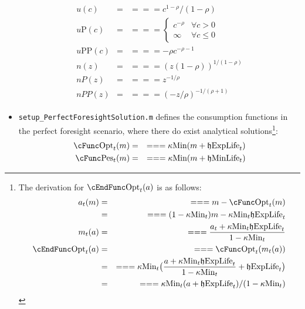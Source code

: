 \documentclass[titlepage,abstract]{\econtex}
\providecommand{\kappaMin}{\kappa\text{Min}}
\providecommand{\cFuncOpt}{\cFunc\text{Opt}}
\providecommand{\cFuncPes}{\cFunc\text{Pes}}
\providecommand{\cEndFuncOpt}{\cEndFunc\text{Opt}}
\providecommand{\hEndExpLife}{\mathfrak{h}\text{ExpLife}}
\providecommand{\hEndMinLife}{\mathfrak{h}\text{MinLife}}
\providecommand{\uP}{u\text{P}}
\providecommand{\uPP}{u\text{PP}}
\begin{document}
\begin{itemize}
\begin{equation}
\begin{gathered}
\begin{aligned}
      u(c)    &=& =  =  =  c^{1-\rho}/(1-\rho) \\
      \uP(c)    &=& =  =  = 
      \begin{cases}
      c^{-\rho} & \forall c>0 \\
      \infty & \forall c \leq 0
      \end{cases} \\
      \uPP(c)    &=& =  =  =  -\rho c^{-\rho-1} \\
      n(z)    &=& =  =  =  (z(1-\rho))^{1/(1-\rho)} \\
      nP(z)    &=& =  =  =  z^{-1/\rho} \\
      nPP(z)    &=& =  =  =  (-z/\rho)^{-1/(\rho+1)}
      \end{aligned}\end{gathered}\end{equation}
      \item \texttt{setup\_PerfectForesightSolution.m} defines the consumption functions in the perfect foresight scenario, where there do exist analytical solutions\footnote{
          The derivation for $\cEndFuncOpt_{t}(a)$ is as follows:
          \begin{equation}\begin{gathered}\begin{aligned}
          a_{t}(m)    &=& =  =  =  m-\cFuncOpt_{t}(m) \\
             &=& =  =  =  (1-\kappaMin_{t}) m -\kappaMin_{t} \hEndExpLife_{t} \\
          m_{t} (a)    &=& =  =  =  \frac{a_{t}+ \kappaMin_{t}\hEndExpLife_{t}}{1-\kappaMin_{t}} \\
          \cEndFuncOpt_{t} (a)    &=& =  =  =  \cFuncOpt_{t}(m_{t}(a)) \\
             &=& =  =  =  \kappaMin_{t} \big(\frac{a+ \kappaMin_{t}\hEndExpLife_{t}}{1-\kappaMin_{t}} + \hEndExpLife_{t}\big) \\
             &=& =  =  =  \kappaMin_{t} (a+ \hEndExpLife_{t})/(1-\kappaMin_{t})
          \end{aligned}\end{gathered}\end{equation}
          }:
          \begin{equation}\begin{gathered}\begin{aligned}
          \cFuncOpt_{t}(m)    &=& =  =  =  \kappaMin (m+\hEndExpLife_{t}) \\
          \cFuncPes_{t}(m)    &=& =  =  =  \kappaMin (m+\hEndMinLife_{t}) \\

\end{aligned}
\end{gathered}
\end{equation}
\end{itemize}
\end{document}
